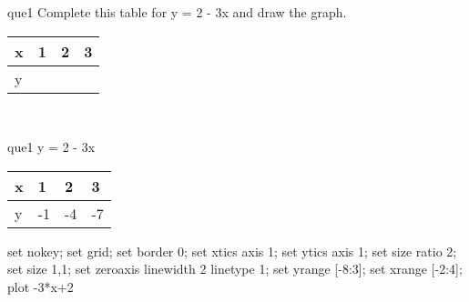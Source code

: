 \documentclass[13.5pt, varwidth=true]{beamer}
\begin{document}
\begin{frame}[shrink=19,fragile]
	\begin{beamercolorbox}[rounded=true, left, shadow=true,wd=14.8cm]{que1}
		 Complete this table for y = 2 - 3x and draw the graph. \\[0.3cm] \renewcommand{\arraystretch}{1.2}\begin{tabular}{|C|C|C|C|} \hline x & 1 & 2 & 3 \\ \hline y & & & \\ \hline \end{tabular}\\[0.3cm]
	\end{beamercolorbox}
\end{frame}
\begin{frame}[shrink=19,fragile]
	\begin{beamercolorbox}[rounded=true, left, shadow=true,wd=14.8cm]{que1}
		y = 2 - 3x\renewcommand{\arraystretch}{1.2}\begin{tabular}{|C|C|C|C|} \hline x & 1 & 2 & 3 \\ \hline y & -1 & -4 & -7\\ \hline \end{tabular}\begin{gnuplot}[terminal=pdf] set nokey; set grid; set border 0; set xtics axis 1; set ytics axis 1; set size ratio 2; set size 1,1; set zeroaxis linewidth 2 linetype 1; set yrange [-8:3]; set xrange [-2:4]; plot -3*x+2 \end{gnuplot}
	\end{beamercolorbox}
\end{frame}
\end{document}

